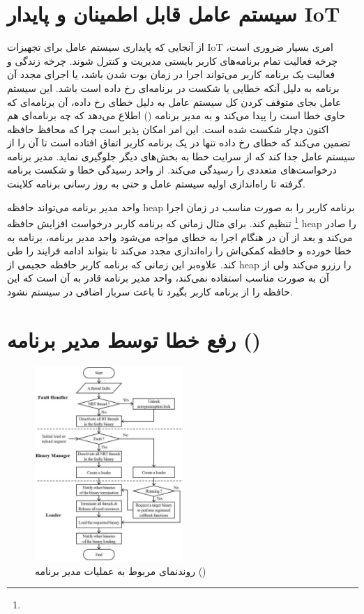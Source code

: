 \documentclass[10pt, a4paper]{article}
\begin{document}
\section{سیستم عامل قابل اطمینان و پایدار IoT}

از آنجایی که پایداری سیستم عامل برای تجهیزات IoT امری بسیار ضروری است، چرخه
فعالیت تمام برنامه‌های کاربر بایستی مدیریت و کنترل شوند. چرخه زندگی و فعالیت یک
برنامه کاربر می‌تواند اجرا در زمان بوت شدن باشد، یا اجرای مجدد آن برنامه به دلیل
آنکه خطایی یا شکست در برنامه‌ای رخ داده است باشد. این سیستم عامل بجای متوقف کردن
کل سیستم عامل به دلیل خطای رخ داده، آن برنامه‌ای که حاوی خطا است را پیدا می‌کند
و به مدیر برنامه () اطلاع می‌دهد که چه برنامه‌ای هم اکنون
دچار شکست شده است. این امر امکان پذیر است چرا که محافظ حافظه تضمین می‌کند که
خطای رخ داده تنها در یک برنامه کاربر اتفاق افتاده است تا آن را از سیستم عامل جدا
کند که از سرایت خطا به بخش‌های دیگر جلوگیری نماید. مدیر برنامه درخواست‌های
متعددی را رسیدگی می‌کند. از واحد رسیدگی خطا و شکست برنامه گرفته تا را‌ه‌اندازی
اولیه سیستم عامل و حتی به روز رسانی برنامه کلاینت.

واحد مدیر برنامه می‌تواند حافظه heap برنامه کاربر را به صورت مناسب در زمان اجرا
\footnote{} تنظیم کند. برای مثال زمانی که برنامه کاربر درخواست
افزایش حافظه heap را صادر می‌کند و بعد از آن در هنگام اجرا به خطای 
مواجه می‌شود واحد مدیر برنامه، برنامه به خطا خورده و حافظه کمکی‌اش را راه‌اندازی
مجدد می‌کند تا بتواند ادامه فرایند را طی کند. علاوه‌بر این زمانی که برنامه کاربر
حافظه حجیمی از heap را رزرو می‌کند ولی از آن به صورت مناسب استفاده نمی‌کند، واحد
مدیر برنامه قادر به آن است که این حافظه را از برنامه کاربر بگیرد تا باعث سربار
اضافی در سیستم نشود.


\section{رفع خطا توسط مدیر برنامه ()}

\begin{figure}[H]
    \centering
    \includegraphics[width=0.5\textwidth]{figs/bin_manager_flowchart.png}
    \caption{روند‌نمای مربوط به عملیات مدیر برنامه ()}
    \label{fig:binaryManagerFaultHanlder}
\end{figure}
\end{document}
